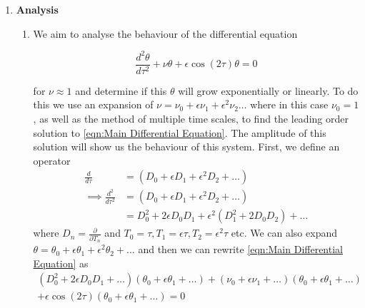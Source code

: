 \documentclass[12pt]{article}
\begin{document}
    \begin{enumerate}
        \item \textbf{Analysis} \newline
        \begin{enumerate}
            \item We aim to analyse the behaviour of the differential equation 
            
            \begin{equation}
                \frac{d^2\theta}{d\tau^2}+\nu \theta +\epsilon\cos(2\tau)\theta = 0
                \label{eqn:Main Differential Equation}
            \end{equation}

            for $\nu \approx 1$ and determine if this $\theta$ will grow exponentially or linearly. 
            To do this we use an expansion of $\nu = \nu_0 +\epsilon\nu_1+\epsilon^2\nu_2\dots$ 
            where in this case $\nu_0 = 1$, as well as the method of multiple time scales, to find 
            the leading order solution to \autoref{eqn:Main Differential Equation}. The amplitude of 
            this solution will show us the behaviour of this system. \newline
            \newline
            First, we define an operator
            \begin{equation*}
                \begin{split}
                    \frac{d}{d\tau} &= (D_0+\epsilon D_1+\epsilon^2 D_2+\dots) \\
                    \implies \frac{d^2}{d\tau^2} &= (D_0+\epsilon D_1+\epsilon^2 D_2+\dots) \\
                    &= D_0^2 + 2\epsilon D_0D_1 +\epsilon^2(D_1^2+2D_0D_2)+\dots
                \end{split}
            \end{equation*}
            where $D_n = \frac{\partial}{\partial T_n}$ and $T_0=\tau, T_1=\epsilon\tau, T_2=\epsilon^2\tau$ etc. 
            We can also expand $\theta = \theta_0+\epsilon\theta_1+\epsilon^2\theta_2+\dots$ and then we 
            can rewrite \autoref{eqn:Main Differential Equation} as 
            \begin{equation}
                \begin{gathered}
                    (D_0^2 + 2\epsilon D_0D_1 +\dots)(\theta_0+\epsilon\theta_1+\dots)+(\nu_0 +\epsilon\nu_1+\dots)(\theta_0+\epsilon\theta_1+\dots) \\
                    +\epsilon\cos(2\tau)(\theta_0+\epsilon\theta_1+\dots) = 0
                \end{gathered}
                \label{eqn:Expanded Main Differential Equation A}
            \end{equation}


\end{enumerate}
\end{enumerate}
\end{document}
